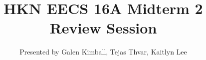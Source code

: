 

\title{HKN EECS 16A Midterm 2 Review Session}
\author{Presented by Galen Kimball, Tejas Thvar, Kaitlyn Lee}
\date{}

\newcommand{\SlideAccessingLogistics}{@\#}











 





